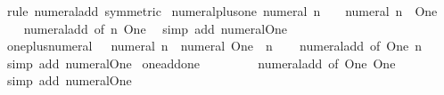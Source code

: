 \begin{isabellebody}
%
\isatagproof
{}\isamarkupfalse%
\ {\isacharparenleft}{\kern0pt}rule\ numeral{\isacharunderscore}{\kern0pt}add\ {\isacharbrackleft}{\kern0pt}symmetric{\isacharbrackright}{\kern0pt}{\isacharparenright}{\kern0pt}%
\endisatagproof
{\isafoldproof}%
%
\isadelimproof
\isanewline
%
\endisadelimproof
\isanewline
{}\isamarkupfalse%
\ numeral{\isacharunderscore}{\kern0pt}plus{\isacharunderscore}{\kern0pt}one{\isacharcolon}{\kern0pt}\ {\isachardoublequoteopen}numeral\ n\ {\isacharplus}{\kern0pt}\ {}\ {\isacharequal}{\kern0pt}\ numeral\ {\isacharparenleft}{\kern0pt}n\ {\isacharplus}{\kern0pt}\ One{\isacharparenright}{\kern0pt}{\isachardoublequoteclose}\isanewline
%
\isadelimproof
\ \ %
\endisadelimproof
%
\isatagproof
{}\isamarkupfalse%
\ numeral{\isacharunderscore}{\kern0pt}add\ {\isacharbrackleft}{\kern0pt}of\ n\ One{\isacharbrackright}{\kern0pt}\ \isamarkupfalse%
\ {\isacharparenleft}{\kern0pt}simp\ add{\isacharcolon}{\kern0pt}\ numeral{\isacharunderscore}{\kern0pt}One{\isacharparenright}{\kern0pt}%
\endisatagproof
{\isafoldproof}%
%
\isadelimproof
\isanewline
%
\endisadelimproof
\isanewline
{}\isamarkupfalse%
\ one{\isacharunderscore}{\kern0pt}plus{\isacharunderscore}{\kern0pt}numeral{\isacharcolon}{\kern0pt}\ {\isachardoublequoteopen}{}\ {\isacharplus}{\kern0pt}\ numeral\ n\ {\isacharequal}{\kern0pt}\ numeral\ {\isacharparenleft}{\kern0pt}One\ {\isacharplus}{\kern0pt}\ n{\isacharparenright}{\kern0pt}{\isachardoublequoteclose}\isanewline
%
\isadelimproof
\ \ %
\endisadelimproof
%
\isatagproof
{}\isamarkupfalse%
\ numeral{\isacharunderscore}{\kern0pt}add\ {\isacharbrackleft}{\kern0pt}of\ One\ n{\isacharbrackright}{\kern0pt}\ \isamarkupfalse%
\ {\isacharparenleft}{\kern0pt}simp\ add{\isacharcolon}{\kern0pt}\ numeral{\isacharunderscore}{\kern0pt}One{\isacharparenright}{\kern0pt}%
\endisatagproof
{\isafoldproof}%
%
\isadelimproof
\isanewline
%
\endisadelimproof
\isanewline
{}\isamarkupfalse%
\ one{\isacharunderscore}{\kern0pt}add{\isacharunderscore}{\kern0pt}one{\isacharcolon}{\kern0pt}\ {\isachardoublequoteopen}{}\ {\isacharplus}{\kern0pt}\ {}\ {\isacharequal}{\kern0pt}\ {}{\isachardoublequoteclose}\isanewline
%
\isadelimproof
\ \ %
\endisadelimproof
%
\isatagproof
{}\isamarkupfalse%
\ numeral{\isacharunderscore}{\kern0pt}add\ {\isacharbrackleft}{\kern0pt}of\ One\ One{\isacharbrackright}{\kern0pt}\ \isamarkupfalse%
\ {\isacharparenleft}{\kern0pt}simp\ add{\isacharcolon}{\kern0pt}\ numeral{\isacharunderscore}{\kern0pt}One{\isacharparenright}{\kern0pt}%

\end{isabellebody}

